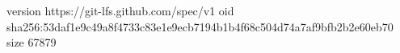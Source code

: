 version https://git-lfs.github.com/spec/v1
oid sha256:53daf1e9c49a8f4733c83e1e9ecb7194b1b4f68c504d74a7af9bfb2b2e60eb70
size 67879
